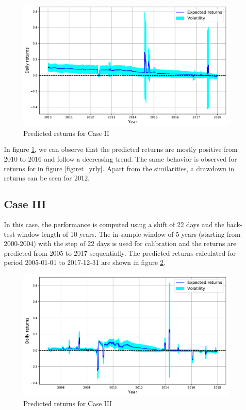 \begin{figure}[h!] 
\centering
 \includegraphics[width=0.75\linewidth]{figures/exp_ret_llf10.pdf}
\caption{Predicted returns for Case II}
\label{fig:ret_mnthly10}
\end{figure}  


In figure \ref{fig:ret_mnthly10}, we can observe that the predicted returns are mostly positive from 2010 to 2016 and follow a decreasing trend. The same behavior is observed for returns for in figure \ref{fig:ret_yrly}. Apart from the similarities, a drawdown in returns can be seen for 2012.


\subsection{Case III}
In this case, the performance is computed using a shift of 22 days and the back-test window length of 10 years. The in-sample window of 5 years (starting from 2000-2004) with the step of 22 days is used for calibration and the returns are predicted from 2005 to 2017 sequentially. The predicted returns calculated for period 2005-01-01 to 2017-12-31 are shown in figure \ref{fig:ret_mnthly5}.

\begin{figure}[h!] 
\centering
 \includegraphics[width=0.75\linewidth]{figures/exp_ret_llf5.pdf}
\caption{Predicted returns for Case III}
\label{fig:ret_mnthly5}
\end{figure}  


